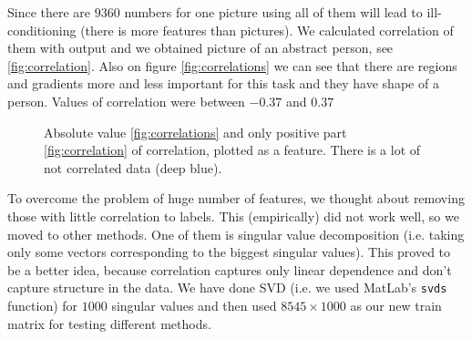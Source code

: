 \documentclass[]{report}
\begin{document}
  Since there are $9360$ numbers for one picture using all of them will lead to ill-conditioning (there is more features than pictures). We calculated correlation of them with output and we obtained picture of an abstract person, see \ref{fig:correlation}.
  Also on figure \ref{fig:correlations} we can see that there are regions and gradients more and less important for this task and they have shape of a person. Values of correlation were between $-0.37$ and $0.37$
  \begin{figure}[t]
    \center
      \;\;\;
    \caption{Absolute value \ref{fig:correlations} and only positive part \ref{fig:correlation} of correlation, plotted as a feature. There is a lot of not correlated data (deep blue).}
  \end{figure}
  To overcome the problem of huge number of features, we thought about removing those with little correlation to labels. This (empirically) did not work well, so we moved to other methods. One of them is singular value decomposition (i.e. taking only some vectors corresponding to the biggest singular values). This proved to be a better idea, because correlation captures only linear dependence and don't capture structure in the data. We have done SVD (i.e. we used MatLab's \verb+svds+ function) for $1000$ singular values and then used $8545\times1000$ as our new train matrix for testing different methods.
  
\end{document}
